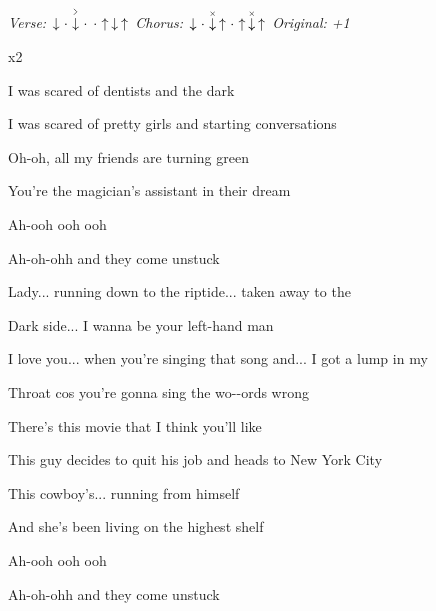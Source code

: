 \begin{song}


 \quad
\textit{Verse:} $\Down\Miss\AccentDown\Miss\Miss\Up\Down\Up$ \quad
\textit{Chorus:} $\Down\Miss\ChuckDown\Up\Miss\Up\ChuckDown\Up$ \quad
\textit{Original: +1}

\large


\large

\bigskip

    x2

\bigskip

I was scared of dentists and the dark \par
{}I was scared of pretty girls and starting conversations \par
Oh-oh, all my friends are turning green \par
You're the magician's assistant in their dream \par
Ah-ooh ooh ooh \par
Ah-oh-ohh  and they come unstuck \par

\bigskip

\begin{chorusbox}{\Chorus}
Lady... running down to the riptide... taken away to the \par
{}Dark side... I wanna be your left-hand man \par
I love you... when you're singing that song and... I got a lump in my \par
{}Throat cos you're gonna sing the wo--ords wrong \par
\end{chorusbox}

\bigskip

There's this movie that I think you'll like \par
This  guy decides to quit his job and heads to New York City \par
This cowboy's... running from himself \par
And she's been living on the highest shelf \par
Ah-ooh ooh ooh \par
Ah-oh-ohh  and they come unstuck \par


\end{song}
